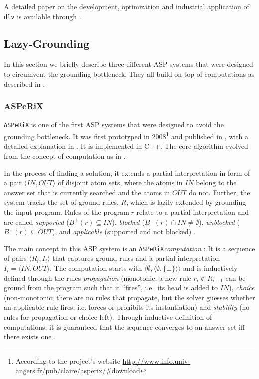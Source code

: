 \documentclass{vutinfth} %
\newcommand{\bodyf}{B}
\newcommand{\asperix}{\texttt{ASPeRiX}\xspace}
\newcommand{\dlv}{\texttt{dlv}\xspace}
\begin{document}
A detailed paper on the development, optimization and industrial application of \dlv is available through \cite{dlvproject}.

\subsection{Lazy-Grounding}

In this section we briefly describe three different ASP systems that were designed to circumvent the grounding bottleneck. They all build on top of computations as described in \cite{computations}.

\subsubsection{ASPeRiX}
\label{sec:asperix}

\asperix is one of the first ASP systems that were designed to avoid the grounding bottleneck. It was first prototyped in 2008\footnote{According to the project's website \url{http://www.info.univ-angers.fr/pub/claire/asperix/\#download}} and published in \cite{asperixfirst,fofchain}, with a detailed explanation in \cite{asperix}. It is implemented in C++. The core algorithm evolved from the concept of computation as in \cite{computations}.

In the process of finding a solution, it extends a partial interpretation \cite[Def.~4]{asperix} in form of a pair $\langle IN, OUT \rangle$ of disjoint atom sets, where the atoms in $IN$ belong to the answer set that is currently searched and the atoms in $OUT$ do not. Further, the system tracks the set of ground rules, $R$, which is lazily extended by grounding the input program. Rules of the program $r$ relate to a partial interpretation and are called \emph{supported} ($\bodyf^+(r) \subseteq IN$), \emph{blocked} ($\bodyf^-(r) \cap IN \not = \emptyset$), \emph{unblocked} ($\bodyf^-(r) \subseteq OUT$), and \emph{applicable} (supported and not blocked) \cite[Def.~5]{asperix}. 

The main concept in this ASP system is an \asperix \emph{computation} \cite[Def.~7]{asperix}: It is a sequence of pairs $\langle R_i, I_i \rangle$ that captures ground rules and a partial interpretation $I_i = \langle IN, OUT \rangle$. The computation starts with $\langle \emptyset, \langle \emptyset, \{ \bot \} \rangle \rangle$ and is inductively defined through the rules \emph{propagation} (monotonic; a new rule $r_i \not \in R_{i-1}$ can be ground from the program such that it \enquote{fires}, i.e.~its head is added to $IN$), \emph{choice} (non-monotonic; there are no rules that propagate, but the solver guesses whether an applicable rule fires, i.e. forces or prohibits its instantiation) and \emph{stability} (no rules for propagation or choice left). Through inductive definition of computations, it is guaranteed that the sequence converges to an answer set iff there exists one \cite[Thm.~2]{asperix}.
\end{document}
